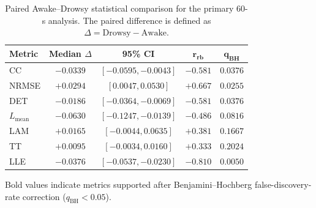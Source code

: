 \begin{table}[t]
    \centering
    \caption{Paired Awake--Drowsy statistical comparison for the primary $60$-s analysis. The paired difference is defined as $\Delta=\mathrm{Drowsy}-\mathrm{Awake}$.}
    \label{tab:awake_drowsy_statistics}
    \footnotesize
    \setlength{\tabcolsep}{3.2pt}
    \renewcommand{\arraystretch}{1.08}

    \begin{tabular}{lcccc}
        \toprule
        \textbf{Metric}
        & \textbf{Median $\Delta$}
        & \textbf{95\% CI}
        & $\mathbf{r_{rb}}$
        & $\mathbf{q_{BH}}$ \\
        \midrule

        CC
        & $-0.0339$
        & $[-0.0595,-0.0043]$
        & $-0.581$
        & $\mathbf{0.0376}$ \\

        NRMSE
        & $+0.0294$
        & $[0.0047,0.0530]$
        & $+0.667$
        & $\mathbf{0.0255}$ \\

        DET
        & $-0.0186$
        & $[-0.0364,-0.0069]$
        & $-0.581$
        & $\mathbf{0.0376}$ \\

        $L_{\mathrm{mean}}$
        & $-0.0630$
        & $[-0.1247,-0.0139]$
        & $-0.486$
        & $0.0816$ \\

        LAM
        & $+0.0165$
        & $[-0.0044,0.0635]$
        & $+0.381$
        & $0.1667$ \\

        TT
        & $+0.0095$
        & $[-0.0034,0.0160]$
        & $+0.333$
        & $0.2024$ \\

        LLE
        & $-0.0376$
        & $[-0.0537,-0.0230]$
        & $-0.810$
        & $\mathbf{0.0050}$ \\

        \bottomrule
    \end{tabular}

    \vspace{1mm}

    \begin{minipage}{0.97\columnwidth}
        \footnotesize
        Bold values indicate metrics supported after Benjamini--Hochberg false-discovery-rate correction ($q_{\mathrm{BH}}<0.05$).
    \end{minipage}
\end{table}

